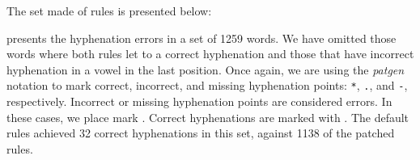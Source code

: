 The set made of \NumberOfNewRules{} rules is presented below:
\begin{multicols}{6}
    \footnotesize
    
\end{multicols}

 presents the hyphenation errors in a set of 1259 words.
We have omitted those words where both rules let to a correct hyphenation and
those that have incorrect hyphenation in a vowel in the last position. 
Once again, we are using the \emph{patgen} notation to mark correct, incorrect,
and missing hyphenation points: \texttt{*}, \texttt{.}, and \texttt{-}, respectively.
Incorrect or missing hyphenation points are considered errors. In these cases,
we place mark \xmark. Correct hyphenations are marked with \cmark.
The default rules achieved 32 correct hyphenations in this set, against 1138 
of the patched rules.



